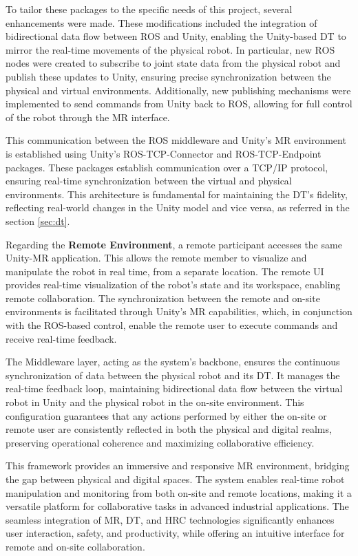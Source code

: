 To tailor these packages to the specific needs of this project, several enhancements were made. These modifications included the integration of bidirectional data flow between \ac{ROS} and Unity, enabling the Unity-based \ac{DT} to mirror the real-time movements of the physical robot. In particular, new \ac{ROS} nodes were created to subscribe to joint state data from the physical robot and publish these updates to Unity, ensuring precise synchronization between the physical and virtual environments. Additionally, new publishing mechanisms were implemented to send commands from Unity back to \ac{ROS}, allowing for full control of the robot through the \ac{MR} interface. 

This communication between the \ac{ROS} middleware and Unity’s \ac{MR} environment is established using Unity’s \ac{ROS}-\ac{TCP}-Connector and \ac{ROS}-\ac{TCP}-Endpoint packages. These packages establish communication over a \ac{TCP}/\ac{IP} protocol, ensuring real-time synchronization between the virtual and physical environments. This architecture is fundamental for maintaining the \ac{DT}'s fidelity, reflecting real-world changes in the Unity model and vice versa, as referred in the section \ref{sec:dt}.

Regarding the \textbf{Remote Environment}, a remote participant accesses the same Unity-\ac{MR} application. This allows the remote member to visualize and manipulate the robot in real time, from a separate location. The remote \ac{UI} provides real-time visualization of the robot’s state and its workspace, enabling remote collaboration. The synchronization between the remote and on-site environments is facilitated through Unity’s \ac{MR} capabilities, which, in conjunction with the \ac{ROS}-based control, enable the remote user to execute commands and receive real-time feedback.

The Middleware layer, acting as the system’s backbone, ensures the continuous synchronization of data between the physical robot and its \ac{DT}. It manages the real-time feedback loop, maintaining bidirectional data flow between the virtual robot in Unity and the physical robot in the on-site environment. This configuration guarantees that any actions performed by either the on-site or remote user are consistently reflected in both the physical and digital realms, preserving operational coherence and maximizing collaborative efficiency.

This framework provides an immersive and responsive \ac{MR} environment, bridging the gap between physical and digital spaces. The system enables real-time robot manipulation and monitoring from both on-site and remote locations, making it a versatile platform for collaborative tasks in advanced industrial applications. The seamless integration of \ac{MR}, \ac{DT}, and \ac{HRC} technologies significantly enhances user interaction, safety, and productivity, while offering an intuitive interface for remote and on-site collaboration.

